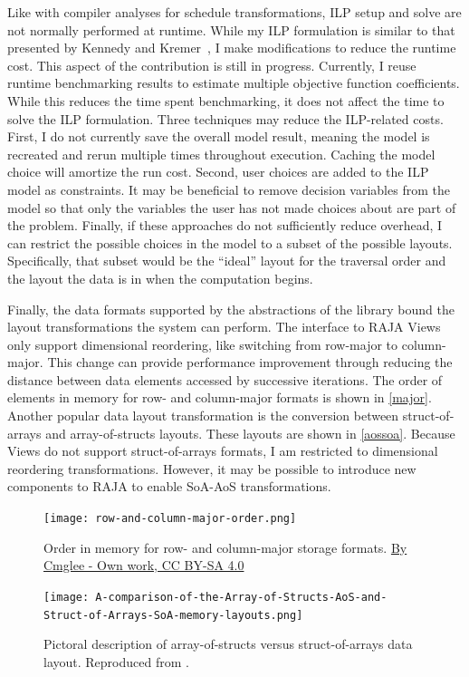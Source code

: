 \documentclass{article}
\begin{document}
Like with compiler analyses for schedule transformations, ILP setup and solve are not normally performed at runtime. 
While my ILP formulation is similar to that presented by Kennedy and Kremer~\cite{kennedy1998automatic}, I make modifications to reduce the runtime cost.
This aspect of the contribution is still in progress.
Currently, I reuse runtime benchmarking results to estimate multiple objective function coefficients.
While this reduces the time spent benchmarking, it does not affect the time to solve the ILP formulation.
Three techniques may reduce the ILP-related costs.
First, I do not currently save the overall model result, meaning the model is recreated and rerun multiple times throughout execution.
Caching the model choice will amortize the run cost.
Second, user choices are added to the ILP model as constraints.
It may be beneficial to remove decision variables from the model so that only the variables the user has not made choices about are part of the problem.
Finally, if these approaches do not sufficiently reduce overhead, I can restrict the possible choices in the model to a subset of the possible layouts.
Specifically, that subset would be the \enquote{ideal} layout for the traversal order and the layout the data is in when the computation begins.


Finally, the data formats supported by the abstractions of the library bound the layout transformations the system can perform.
The interface to RAJA Views only support dimensional reordering, like switching from row-major to column-major. 
This change can provide performance improvement through reducing the distance between data elements accessed by successive iterations.
The order of elements in memory for row- and column-major formats is shown in \autoref{major}.
Another popular data layout transformation is the conversion between struct-of-arrays and array-of-structs layouts. 
These layouts are shown in \autoref{aossoa}.
Because Views do not support struct-of-arrays formats, I am restricted to dimensional reordering transformations.
However, it may be possible to introduce new components to RAJA to enable SoA-AoS transformations.

\begin{figure}
\texttt{[image: row-and-column-major-order.png]}
\caption{Order in memory for row- and column-major storage formats. \href{https://commons.wikimedia.org/w/index.php?curid=65107030}{By Cmglee - Own work, CC BY-SA 4.0}}
\label{major}
\end{figure}


\begin{figure}
\texttt{[image: A-comparison-of-the-Array-of-Structs-AoS-and-Struct-of-Arrays-SoA-memory-layouts.png]}
\caption{Pictoral description of array-of-structs versus struct-of-arrays data layout. Reproduced from \cite{pennycook2013investigation}.}
\label{aossoa}
\end{figure}
    
\end{document}
